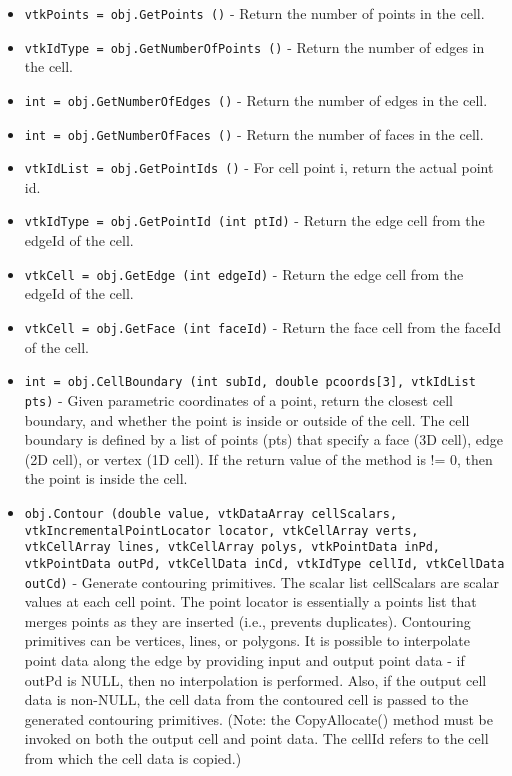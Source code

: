 \begin{itemize}
\item  \verb|vtkPoints = obj.GetPoints ()| -  Return the number of points in the cell.

\item  \verb|vtkIdType = obj.GetNumberOfPoints ()| -  Return the number of edges in the cell.

\item  \verb|int = obj.GetNumberOfEdges ()| -  Return the number of edges in the cell.

\item  \verb|int = obj.GetNumberOfFaces ()| -  Return the number of faces in the cell.

\item  \verb|vtkIdList = obj.GetPointIds ()| -  For cell point i, return the actual point id.

\item  \verb|vtkIdType = obj.GetPointId (int ptId)| -  Return the edge cell from the edgeId of the cell.

\item  \verb|vtkCell = obj.GetEdge (int edgeId)| -  Return the edge cell from the edgeId of the cell.

\item  \verb|vtkCell = obj.GetFace (int faceId)| -  Return the face cell from the faceId of the cell.

\item  \verb|int = obj.CellBoundary (int subId, double pcoords[3], vtkIdList pts)| -  Given parametric coordinates of a point, return the closest cell
 boundary, and whether the point is inside or outside of the cell. The
 cell boundary is defined by a list of points (pts) that specify a face
 (3D cell), edge (2D cell), or vertex (1D cell). If the return value of
 the method is != 0, then the point is inside the cell.

\item  \verb|obj.Contour (double value, vtkDataArray cellScalars, vtkIncrementalPointLocator locator, vtkCellArray verts, vtkCellArray lines, vtkCellArray polys, vtkPointData inPd, vtkPointData outPd, vtkCellData inCd, vtkIdType cellId, vtkCellData outCd)| -  Generate contouring primitives. The scalar list cellScalars are
 scalar values at each cell point. The point locator is essentially a 
 points list that merges points as they are inserted (i.e., prevents 
 duplicates). Contouring primitives can be vertices, lines, or
 polygons. It is possible to interpolate point data along the edge
 by providing input and output point data - if outPd is NULL, then
 no interpolation is performed. Also, if the output cell data is
 non-NULL, the cell data from the contoured cell is passed to the
 generated contouring primitives. (Note: the CopyAllocate() method
 must be invoked on both the output cell and point data. The 
 cellId refers to the cell from which the cell data is copied.)


\end{itemize}
